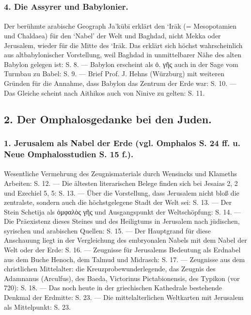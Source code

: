 \documentclass[a4paper, 11pt, oneside]{article}
\begin{document}
\subsubsection*{4. Die Assyrer und Babylonier.}
\paragraph{}
Der berühmte arabische Geograph Ja'kūbī erklärt den `Irāk (= Mesopotamien und Chaldaea) für den `Nabel' der Welt und Baghdad, nicht Mekka oder Jerusalem, wieder für die Mitte des `Irāk. Das erklärt sich höchst wahrscheinlich aus altbabylonischer Vorstellung, weil Baghdad in unmittelbarer Nähe des alten Babylon gelegen ist: S. 8. --- Babylon erscheint als ὀ. γῆς auch in der Sage vom Turmbau zu Babel: S. 9. --- Brief Prof. J. Hehns (Würzburg) mit weiteren Gründen für die Annahme, dass Babylon das Zentrum der Erde war: S. 10. --- Das Gleiche scheint nach Aithikos auch von Ninive zu gelten: S. 11.

\subsection*{2. Der Omphalosgedanke bei den Juden.}
\subsubsection*{1. Jerusalem als Nabel der Erde (vgl. Omphalos S. 24 ff. u. Neue Omphalosstudien S. 15 f.).}
\paragraph{}
Wesentliche Vermehrung des Zeugnismaterials durch Wensincks und Klameths Arbeiten: S. 12. --- Die ältesten literarischen Belege finden sich bei Jesaias 2, 2 und Ezechiel 5, 5: S. 13. --- Über die Vorstellung, dass Jerusalem nicht bloß die zentralste, sondern auch die höchstgelegene Stadt der Welt sei: S. 13. --- Der Stein Schetija als ὀμφαλὸς γῆς und Ausgangspunkt der Weltschöpfung: S. 14. --- Die Präexistenz dieses Steines und des Heiligtums in Jerusalem nach jüdischen, syrischen und arabischen Quellen: S. 15. --- Der Hauptgrand für diese Anschauung liegt in der Vergleichung des embryonalen Nabels mit dem Nabel der Welt oder der Erde: S. 16. --- Zeugnisse für Jerusalems Bedeutung als Erdnabel aus dem Buche Henoch, dem Talmud und Midrasch: S. 17. --- Zeugnisse aus dem christlichen Mittelalter: die Kreuzprobewunderlegende, das Zeugnis des Adamnanus (Arculfus), des Baeda, Victorinus Pictabionensis, des Typikon (vor 720): S. 18. --- Das noch heute in der griechischen Kathedrale bestehende Denkmal der Erdmitte: S. 23. --- Die mittelalterlichen Weltkarten mit Jerusalem als Mittelpunkt: S. 23.
\end{document}
